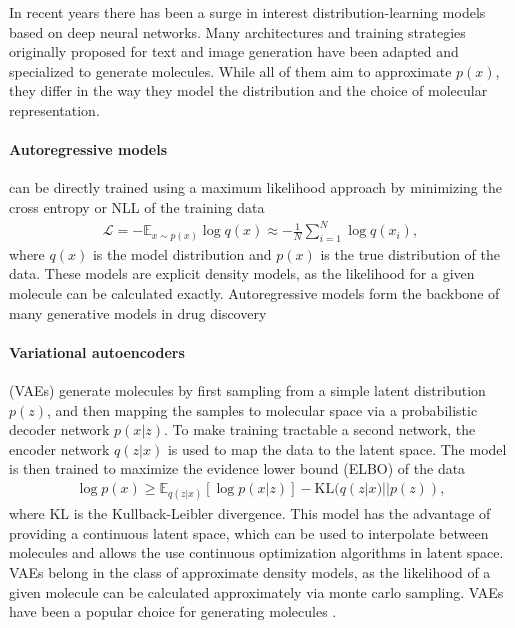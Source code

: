 In recent years there has been a surge in interest distribution-learning models based on deep neural
networks. Many architectures and training strategies originally proposed for text and image
generation have been adapted and specialized to generate molecules. While all of them aim to
approximate $p(x)$, they differ in the way they model the distribution and the choice of molecular
representation.

\paragraph{Autoregressive models} can be directly trained using a maximum likelihood approach by
minimizing the cross entropy or \ac{NLL} of the training data
\begin{align}
      \mathcal{L} = - \mathbb{E}_{x \sim p(x)} \log q(x) \approx - \frac{1}{N} \sum_{i=1}^N \log q(x_i),
\end{align}
where $q(x)$ is the model distribution and $p(x)$ is the true distribution of the data. These models
are explicit density models, as the likelihood for a given molecule can be calculated exactly.
Autoregressive models form the backbone of many generative models in drug discovery
\citep{gomez-bombarelliAutomaticChemicalDesign2018,seglerGeneratingFocusedMolecule2018,olivecronaMolecularDenovoDesign2017,guoAugmentedMemoryCapitalizing2023,thomasAugmentedHillClimbIncreases2022,jaquesSequenceTutorConservative2016,cohen-karlikOvercomingOrderAutoregressive2024,}

\paragraph{Variational autoencoders} (VAEs) \citep{kingmaAutoEncodingVariationalBayes2013} generate molecules by first
sampling from a simple latent distribution $p(z)$, and then mapping the samples to molecular space
via a probabilistic decoder network $p(x|z)$. To make training tractable a second network, the
encoder network $q(z|x)$ is used to map the data to the latent space. The model is then trained to
maximize the evidence lower bound (ELBO) of the data
\begin{align}
      \log p(x) \geq \mathbb{E}_{q(z|x)}[\log p(x|z)] - \text{KL}(q(z|x) || p(z)),
\end{align}
where KL is the Kullback-Leibler divergence. This model has the advantage of providing a continuous
latent space, which can be used to interpolate between molecules and allows the use continuous
optimization algorithms in latent space. VAEs belong in the class of approximate density models, as
the likelihood of a given molecule can be calculated approximately via monte carlo sampling. VAEs
have been a popular choice for generating molecules
\citep{gomez-bombarelliAutomaticChemicalDesign2018,kusnerGrammarVariationalAutoencoder2017,simonovskyGraphVAEGenerationSmall2018,samantaNeVAEDeepGenerative2018,jinJunctionTreeVariational2018,daiSyntaxDirectedVariationalAutoencoder2018,liuConstrainedGraphVariational2018}.


